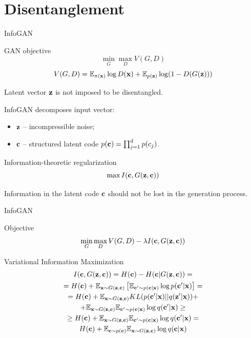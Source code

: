 \documentclass{beamer}
\begin{document}
\section{Disentanglement}
\begin{frame}{InfoGAN}
	\begin{block}{GAN objective}
		\vspace{-0.6cm}
		\[
		\min_{G} \max_D V(G, D)
		\]
		\[
		V(G, D)  =  \mathbb{E}_{\pi(\mathbf{x})} \log D(\mathbf{x}) + \mathbb{E}_{p(\mathbf{z})} \log (1 - D(G(\mathbf{z})))
		\]
	\end{block}
	Latent vector $\mathbf{z}$ is not imposed to be disentangled.
	
	InfoGAN decomposes input vector:
	\begin{itemize}
		\item $\mathbf{z}$ -- incompressible noise;
		\item $\mathbf{c}$ -- structured latent code $p(\mathbf{c}) = \prod_{j=1}^d p(c_j)$.
	\end{itemize}
	\begin{block}{Information-theoretic regularization}
		\vspace{-0.3cm}
		\[
		\max I (\mathbf{c}, G(\mathbf{z}, \mathbf{c}))
		\]
	\end{block}
	Information in the latent code $\mathbf{c}$ should not be lost in the generation process.
\end{frame}
\begin{frame}{InfoGAN}
	\begin{block}{Objective}
		\vspace{-0.3cm}
		\[
		\min_{G} \max_D V(G, D) - \lambda I (\mathbf{c}, G(\mathbf{z}, \mathbf{c}))
		\]
	\end{block}
	\begin{block}{Variational Information Maximization}
		\vspace{-0.3cm}
		\begin{multline*}
			I (\mathbf{c}, G(\mathbf{z}, \mathbf{c})) = H(\mathbf{c}) - H(\mathbf{c} | G(\mathbf{z}, \mathbf{c})) = \\
			= H(\mathbf{c}) + \mathbb{E}_{\mathbf{x} \sim G(\mathbf{z}, \mathbf{c})} \left[ \mathbb{E}_{\mathbf{c}' \sim p(\mathbf{c} | \mathbf{x})} \log p(\mathbf{c}' | \mathbf{x}) \right] = \\ 
			= H(\mathbf{c}) + \mathbb{E}_{\mathbf{x} \sim G(\mathbf{z}, \mathbf{c})} KL(p(\mathbf{c}'| \mathbf{x}) || q(\mathbf{z}' | \mathbf{x})) + 
			\\ + \mathbb{E}_{\mathbf{x} \sim G(\mathbf{z}, \mathbf{c})}  \mathbb{E}_{\mathbf{c}' \sim p(\mathbf{c} | \mathbf{x})} \log q(\mathbf{c}' | \mathbf{x})  \geq\\
			\geq H(\mathbf{c}) + \mathbb{E}_{\mathbf{x} \sim G(\mathbf{z}, \mathbf{c})} \mathbb{E}_{\mathbf{c}' \sim p(\mathbf{c} | \mathbf{x})} \log q(\mathbf{c}' | \mathbf{x}) = \\
			H(\mathbf{c}) + \mathbb{E}_{\mathbf{c} \sim p(\mathbf{c})} \mathbb{E}_{\mathbf{x} \sim G(\mathbf{z}, \mathbf{c})} \log q(\mathbf{c} | \mathbf{x})
		\end{multline*}
	\end{block}
\end{frame}
\end{document}
